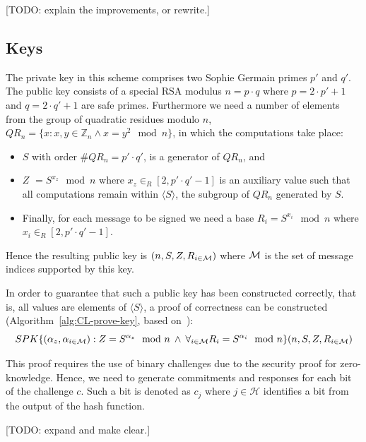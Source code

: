 [TODO: explain the improvements, or rewrite.]

\subsection{Keys}\label{sec:cl_keys}

The private key in this scheme comprises two Sophie Germain primes $p'$ and $q'$.
The public key consists of a special RSA modulus $n = p \cdot q$ where
$p = 2 \cdot p' + 1$ and $q = 2 \cdot q' + 1$ are safe primes. Furthermore we
need a number of elements from the group of quadratic residues modulo $n$,
$QR_n = \{ x : x,y \in \mathbb{Z}_n \land x = y^2 \mod n \}$, in which the
computations take place:
\begin{itemize}
  \item $S$ with order $\#QR_n = p' \cdot q'$, is a generator of $QR_n$, and
  \item $Z$ $= S^{x_z} \mod n$ where $x_z \in_R [2, p' \cdot q' - 1]$ is an
    auxiliary value such that all computations remain within
    $\langle S \rangle$, the subgroup of $QR_n$ generated by $S$.
  \item Finally, for each message to be signed we need a base
    $R_i = S^{x_i} \mod n$ where $x_i \in_R [2, p' \cdot q' - 1]$.
\end{itemize}
Hence the resulting public key is $(n, S, Z, R_{i \in \mathcal{M}})$ where
$\mathcal{M}$ is the set of message indices supported by this key.

In order to guarantee that such a public key has been constructed correctly,
that is, all values are elements of $\langle S \rangle$, a proof of
correctness can be constructed (Algorithm~\ref{alg:CL-prove-key}, based
on~\cite[Appendix A]{BrickellCC2004}):
\begin{equation*}
  SPK \{ (\alpha_z, \alpha_{i \in \mathcal{M}}) : Z = S^{\alpha_z} \mod n \:\land\:
    \forall_{i \in \mathcal{M}} R_i = S^{\alpha_i} \mod n \}(n, S, Z, R_{i \in \mathcal{M}})
\end{equation*}

This proof requires the use of binary challenges due to the security proof for
zero-knowledge. Hence, we need to generate commitments and responses for each
bit of the challenge $c$. Such a bit is denoted as $c_j$ where $j \in \mathcal{H}$
identifies a bit from the output of the hash function.

[TODO: expand and make clear.]
%
%

